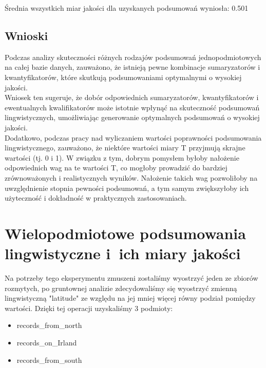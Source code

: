 \documentclass{article}
\begin{document}
\noindent Średnia wszystkich miar jakości dla uzyskanych podsumowań wyniosła: 0.501


\subsection{Wnioski}

\noindent Podczas analizy skuteczności różnych rodzajów podsumowań jednopodmiotowych na całej bazie danych, zauważono, że istnieją pewne kombinacje sumaryzatorów i kwantyfikatorów, które skutkują podsumowaniami optymalnymi o wysokiej jakości. \\

\noindent Wniosek ten sugeruje, że dobór odpowiednich sumaryzatorów, kwantyfikatorów i ewentualnych kwalifikatorów może istotnie wpłynąć na skuteczność podsumowań lingwistycznych, umożliwiając generowanie optymalnych podsumowań o wysokiej jakości. \\

\noindent Dodatkowo, podczas pracy nad wyliczaniem wartości poprawności podsumowania lingwistycznego, zauważono, że niektóre wartości miary T przyjmują skrajne wartości (tj. 0 i 1). W związku z tym, dobrym pomysłem byłoby nałożenie odpowiednich wag na te wartości T, co mogłoby prowadzić do bardziej zrównoważonych i realistycznych wyników. Nałożenie takich wag pozwoliłoby na uwzględnienie stopnia pewności podsumowań, a tym samym zwiększyłoby ich użyteczność i dokładność w praktycznych zastosowaniach.




\section{Wielopodmiotowe podsumowania lingwistyczne i~ich miary jakości}

\noindent Na potrzeby tego eksperymentu zmuszeni zostaliśmy wyostrzyć jeden ze zbiorów rozmytych, po gruntownej analizie zdecydowaliśmy się wyostrzyć zmienną lingwistyczną "latitude" ze względu na jej mniej więcej równy podział pomiędzy wartości. Dzięki tej operacji uzyskaliśmy 3 podmioty:

\begin{itemize}
    \item records\_from\_north
    \item records\_on\_Irland
    \item records\_from\_south
\end{itemize}
\end{document}
